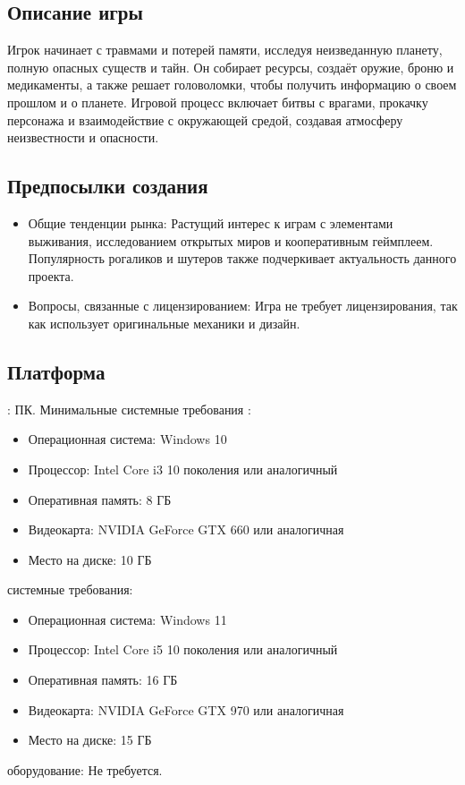 \documentclass[a4paper,12pt]{article}
\begin{document}
\subsection{Описание игры}
Игрок начинает с травмами и потерей памяти, исследуя неизведанную планету, полную опасных существ и тайн. Он собирает ресурсы, создаёт оружие, броню и медикаменты, а также решает головоломки, чтобы получить информацию о своем прошлом и о планете. Игровой процесс включает битвы с врагами, прокачку персонажа и взаимодействие с окружающей средой, создавая атмосферу неизвестности и опасности.
\subsection{Предпосылки создания}
\begin{itemize}
    \item Общие тенденции рынка: Растущий интерес к играм с элементами выживания, исследованием открытых миров и кооперативным геймплеем. Популярность рогаликов и шутеров также подчеркивает актуальность данного проекта.
    \item Вопросы, связанные с лицензированием: Игра не требует лицензирования, так как использует оригинальные механики и дизайн.
\end{itemize}
\subsection{Платформа}

    : ПК.
    Минимальные системные требования :
\begin{itemize}
    \item Операционная система: Windows 10
    \item Процессор: Intel Core i3 10 поколения или аналогичный
    \item Оперативная память: 8 ГБ
    \item Видеокарта: NVIDIA GeForce GTX 660 или аналогичная
    \item Место на диске: 10 ГБ
\end{itemize}
     системные требования:
\begin{itemize}
    \item Операционная система: Windows 11
    \item Процессор: Intel Core i5 10 поколения или аналогичный
    \item Оперативная память: 16 ГБ
    \item Видеокарта: NVIDIA GeForce GTX 970 или аналогичная
    \item Место на диске: 15 ГБ
\end{itemize}
 оборудование: Не требуется.
\newpage
\end{document}
